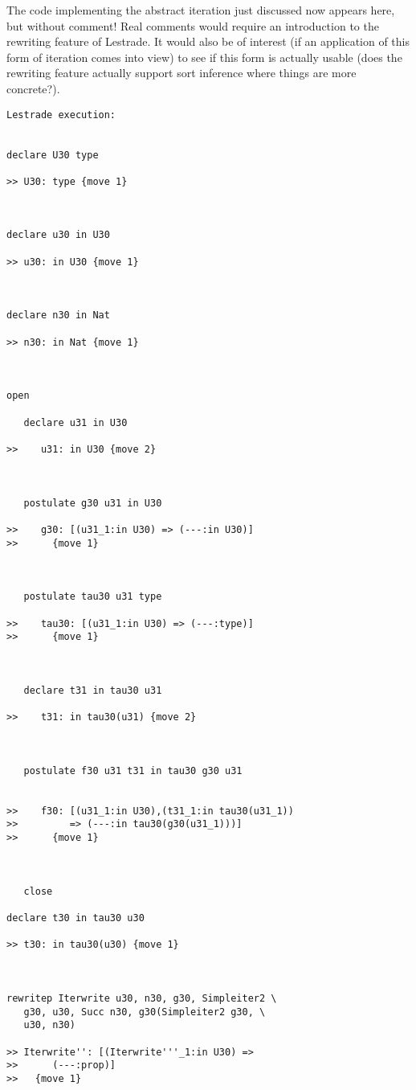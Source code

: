 \documentclass[12pt]{article}
\begin{document}
The code implementing the abstract iteration just discussed now appears here, but without comment!  Real comments would require an introduction to the rewriting feature of Lestrade.  It would also be of interest (if an application of this form of iteration comes into view) to see if this form is actually usable (does the rewriting feature actually support sort inference where things are more concrete?).

\begin{verbatim}Lestrade execution:


declare U30 type

>> U30: type {move 1}



declare u30 in U30

>> u30: in U30 {move 1}



declare n30 in Nat

>> n30: in Nat {move 1}



open

   declare u31 in U30

>>    u31: in U30 {move 2}



   postulate g30 u31 in U30

>>    g30: [(u31_1:in U30) => (---:in U30)]
>>      {move 1}



   postulate tau30 u31 type

>>    tau30: [(u31_1:in U30) => (---:type)]
>>      {move 1}



   declare t31 in tau30 u31

>>    t31: in tau30(u31) {move 2}



   postulate f30 u31 t31 in tau30 g30 u31


>>    f30: [(u31_1:in U30),(t31_1:in tau30(u31_1))
>>         => (---:in tau30(g30(u31_1)))]
>>      {move 1}



   close

declare t30 in tau30 u30

>> t30: in tau30(u30) {move 1}



rewritep Iterwrite u30, n30, g30, Simpleiter2 \
   g30, u30, Succ n30, g30(Simpleiter2 g30, \
   u30, n30)

>> Iterwrite'': [(Iterwrite'''_1:in U30) =>
>>      (---:prop)]
>>   {move 1}




\end{verbatim}
\end{document}
